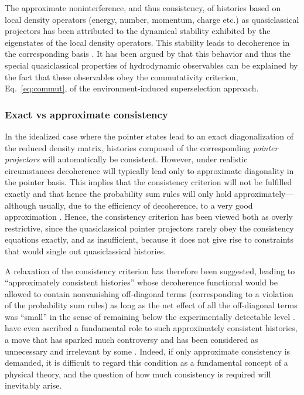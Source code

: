 \documentclass[twocolumn,rmp,aps,amsmath,amsfonts,noshowkeys,noshowpacs]{revtex4}
\begin{document}
The approximate noninterference, and thus consistency, of histories
based on local density operators (energy, number, momentum, charge
etc.) as quasiclassical projectors \citep[the so-called {\em
  hydrodynamic observables},
see][]{GellMann:1991:pp,Dowker:1992:vz,Halliwell:1998:fg} has been
attributed to the dynamical stability exhibited by the eigenstates of
the local density operators. This stability leads to decoherence in
the corresponding basis \citep{Halliwell:1998:fg,Halliwell:1999:ii}.
It has been argued by \citet{Zurek:2002:ii} that this behavior and
thus the special quasiclassical properties of hydrodynamic observables
can be explained by the fact that these observables obey the
commutativity criterion, Eq.~\eqref{eq:commut}, of the
environment-induced superselection approach.


\subsubsection{Exact vs approximate consistency}

In the idealized case where the pointer states lead to an exact
diagonalization of the reduced density matrix, histories composed of
the corresponding {\em pointer projectors} will automatically be
consistent. However, under realistic circumstances decoherence will
typically lead only to approximate diagonality in the pointer basis.
This implies that the consistency criterion will not be fulfilled
exactly and that hence the probability sum rules will only hold
approximately---although usually, due to the efficiency of
decoherence, to a very good approximation
\citep{Griffiths:1984:tr,GellMann:1991:pp,Omnes:1992:gy,%
Omnes:1994:pz,Albrecht:1992:rz,Albrecht:1993:pq,Zurek:1993:pu,%
Paz:1993:ww,Twamley:1993:bz}.  Hence, the consistency
criterion has been viewed both as overly restrictive, since the
quasiclassical pointer projectors rarely obey the consistency
equations exactly, and as insufficient, because it does not give rise
to constraints that would single out quasiclassical histories.

A relaxation of the consistency criterion has therefore been
suggested, leading to ``approximately consistent histories'' whose
decoherence functional would be allowed to contain nonvanishing
off-diagonal terms (corresponding to a violation of the probability
sum rules) as long as the net effect of all the off-diagonal terms was
``small'' in the sense of remaining below the experimentally
detectable level \citep[see, for
example,][]{GellMann:1991:pp,Dowker:1992:vz}.
\citet{GellMann:1991:pp} have even ascribed a fundamental role to such
approximately consistent histories, a move that has sparked much
controversy and has been considered as unnecessary and irrelevant by
some \citep{Dowker:1995:pa,Dowker:1996:ch}. Indeed, if only
approximate consistency is demanded, it is difficult to regard this
condition as a fundamental concept of a physical theory, and the
question of how much consistency is required will inevitably arise.
\end{document}
